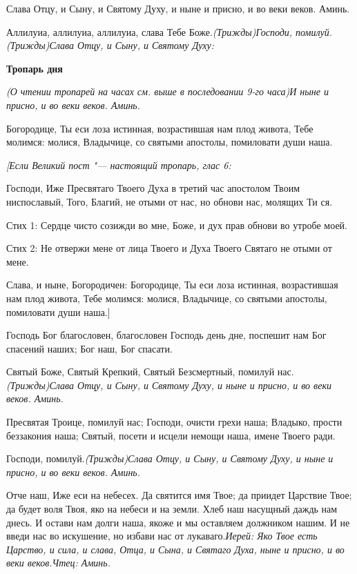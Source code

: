 Слава Отцу, и Сыну, и Святому Духу, и ныне и присно, и во веки веков. Аминь.

Аллилуиа, аллилуиа, аллилуиа, слава Тебе Боже.\itshape  (Трижды)\normalfont{}Господи, помилуй.\itshape  (Трижды)\normalfont{}Слава Отцу, и Сыну, и Святому Духу:


\medskip
\bfseries Тропарь дня\normalfont{}\nopagebreak

\itshape (О чтении тропарей на часах см. выше в последовании 9-го часа)\normalfont{}И ныне и присно, и во веки веков. Аминь.

Богородице, Ты еси лоза истинная, возрастившая нам плод живота, Тебе молимся: молися, Владычице, со святыми апостолы, помиловати души наша.

\itshape [Если Великий пост "--- настоящий тропарь, глас \normalfont{}6:

Господи, Иже Пресвятаго Твоего Духа в третий час апостолом Твоим ниспославый, Того, Благий, не отыми от нас, но обнови нас, молящих Ти ся.

Стих 1: Сердце чисто созижди во мне, Боже, и дух прав обнови во утробе моей. 

Стих 2: Не отвержи мене от лица Твоего и Духа Твоего Святаго не отыми от мене. 

Слава, и ныне, Богородичен: Богородице, Ты еси лоза истинная, возрастившая нам плод живота, Тебе молимся: молися, Владычице, со святыми апостолы, помиловати души наша.]

Господь Бог благословен, благословен Господь день дне, поспешит нам Бог спасений наших; Бог наш, Бог спасати.

Святый Боже, Святый Крепкий, Святый Безсмертный, помилуй нас.\itshape  (Трижды)\normalfont{}Слава Отцу, и Сыну, и Святому Духу, и ныне и присно, и во веки веков. Аминь.

Пресвятая Троице, помилуй нас; Господи, очисти грехи наша; Владыко, прости беззакония наша; Святый, посети и исцели немощи наша, имене Твоего ради.

Господи, помилуй.\itshape  (Трижды)\normalfont{}Слава Отцу, и Сыну, и Святому Духу, и ныне и присно, и во веки веков. Аминь.

Отче наш, Иже еси на небесех. Да святится имя Твое; да приидет Царствие Твое; да будет воля Твоя, яко на небеси и на земли. Хлеб наш насущный даждь нам днесь. И остави нам долги наша, якоже и мы оставляем должником нашим. И не введи нас во искушение, но избави нас от лукаваго.\itshape Иерей\normalfont{}: Яко Твое есть Царство, и сила, и слава, Отца, и Сына, и Святаго Духа, ныне и присно, и во веки веков.\itshape Чтец\normalfont{}: Аминь.



